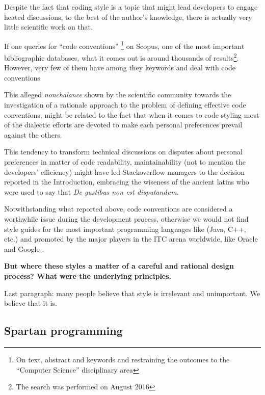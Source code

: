 Despite the fact that coding style is a topic that might lead developers to engage heated 
discussions, to the best of the author's knowledge, there is actually very little scientific 
work on that. 

If one queries for ``code conventions''
\footnote{On text, abstract and keywords and restraining the outcomes to the ``Computer Science''
disciplinary area} 
on Scopus, one of the most important bibliographic databases, what it comes out is around 
thousands of results\footnote{The search was performed on August 2016}. 
However, very few of them  have  among they
keywords and deal with code conventions

This alleged \emph{nonchalance} shown by the scientific community towards the investigation 
of a rationale approach to the problem of defining effective code conventions, might be 
related to the fact that when it comes to code styling most of the dialectic efforts are devoted
to make each personal preferences prevail against the others.

This tendency to transform technical discussions on disputes about personal preferences 
in matter of code readability, maintainability (not to mention the developers' efficiency) might 
have led Stackoverflow managers to the decision reported in the Introduction, embracing the 
wiseness of the ancient latins who were used to say that \emph{De gustibus non est disputandum}.

Notwithstanding what reported above, code conventions are considered a worthwhile issue during 
the development process, otherwise we would not find style guides for the most important 
programming languages like (Java, C++, etc.) and promoted by the major players in 
the ITC arena worldwide, like Oracle and Google \cite{}. 

\textbf{But where these styles a matter of a careful and rational design process?
What were the underlying principles.}

Last paragraph: many people believe that style is irrelevant and unimportant.
We believe that it is.

\subsection{Spartan programming}


